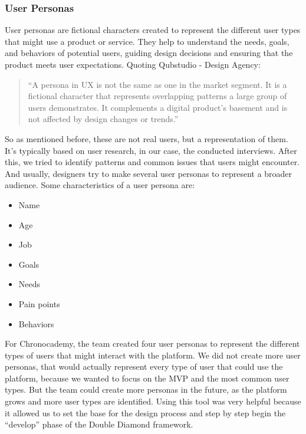 \subsubsection{User Personas}\label{subsubsec:user-personas}
User personas are fictional characters created to represent the different user types that might use a product or service.
They help to understand the needs, goals, and behaviors of potential users, guiding design decisions and ensuring that the product meets user expectations.
Quoting Qubstudio - Design Agency:
\begin{quote}
    ``A persona in UX is not the same as one in the market segment.
    It is a
    fictional character that represents overlapping patterns a large group
    of users demonstrates.
    It complements a digital product’s basement and
    is not affected by design changes or trends.''~\cite[User Personas]{userPersonas}
\end{quote}
So as mentioned before, these are not real users, but a representation of them.
It's typically based on user research, in our case, the conducted interviews.
After this, we tried to identify patterns and common issues that users might encounter.
And usually, designers try to make several user personas to represent a broader audience.\newline\newline
Some characteristics of a user persona are:
\begin{itemize}
    \item Name
    \item Age
    \item Job
    \item Goals
    \item Needs
    \item Pain points
    \item Behaviors
\end{itemize}

For Chronocademy, the team created four user personas to represent the different types of users that might interact with the platform.
We did not create more user personas, that would actually represent every type of user that could use the platform, because we wanted to focus on the MVP and the most common user types.
But the team could create more personas in the future, as the platform grows and more user types are identified.
Using this tool was very helpful because it allowed us to set the base for the design process and step by step begin the ``develop'' phase of the Double Diamond framework.

